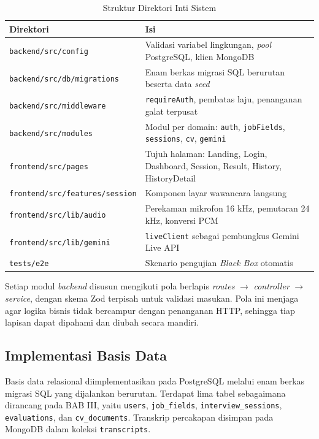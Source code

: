 \documentclass[12pt,a4paper,oneside]{report}
\begin{document}
\begin{table}[H]
\caption{Struktur Direktori Inti Sistem}
\label{tab:struktur}
\centering
\begin{tabularx}{\textwidth}{|L{5.6cm}|X|}
\hline
\textbf{Direktori} & \textbf{Isi} \\
\hline
\texttt{backend/src/config} & Validasi variabel lingkungan, \textit{pool} PostgreSQL, klien MongoDB \\
\hline
\texttt{backend/src/db/migrations} & Enam berkas migrasi SQL berurutan beserta data \textit{seed} \\
\hline
\texttt{backend/src/middleware} & \texttt{requireAuth}, pembatas laju, penanganan galat terpusat \\
\hline
\texttt{backend/src/modules} & Modul per domain: \texttt{auth}, \texttt{jobFields}, \texttt{sessions}, \texttt{cv}, \texttt{gemini} \\
\hline
\texttt{frontend/src/pages} & Tujuh halaman: Landing, Login, Dashboard, Session, Result, History, HistoryDetail \\
\hline
\texttt{frontend/src/features/}\linebreak\texttt{session} & Komponen layar wawancara langsung \\
\hline
\texttt{frontend/src/lib/audio} & Perekaman mikrofon 16 kHz, pemutaran 24 kHz, konversi PCM \\
\hline
\texttt{frontend/src/lib/gemini} & \texttt{liveClient} sebagai pembungkus Gemini Live API \\
\hline
\texttt{tests/e2e} & Skenario pengujian \textit{Black Box} otomatis \\
\hline
\end{tabularx}
\end{table}

Setiap modul \textit{backend} disusun mengikuti pola berlapis
\textit{routes} $\rightarrow$ \textit{controller} $\rightarrow$
\textit{service}, dengan skema Zod terpisah untuk validasi masukan. Pola ini
menjaga agar logika bisnis tidak bercampur dengan penanganan HTTP, sehingga
tiap lapisan dapat dipahami dan diubah secara mandiri.

\subsection{Implementasi Basis Data}

Basis data relasional diimplementasikan pada PostgreSQL melalui enam berkas
migrasi SQL yang dijalankan berurutan. Terdapat lima tabel sebagaimana
dirancang pada BAB III, yaitu \texttt{users}, \texttt{job\_fields},
\texttt{interview\_sessions}, \texttt{evaluations}, dan
\texttt{cv\_documents}. Transkrip percakapan disimpan pada MongoDB dalam
koleksi \texttt{transcripts}.
\end{document}
